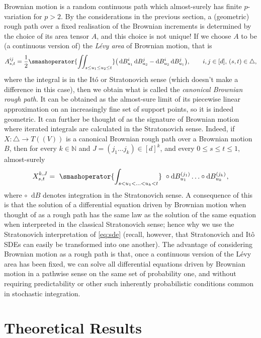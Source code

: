 \documentclass[11pt, letterpaper]{article}
\theoremstyle{definition}
\theoremstyle{remark}
\newcommand{\m}{\hspace{0.25mm}}
\newcommand{\N}{\mathbb{N}}
\newcommand{\diff}{\mathop{}\!\mathrm{d}}
\begin{document}
\begin{appendices}
Brownian motion is a random continuous path which almost-surely has finite $p$-variation for $p > 2$.
By the considerations in the previous section, a (geometric) rough path over a fixed realisation of the Brownian increments is determined by the choice of its area tensor $A$, and this choice is not unique! 
If we choose $A$ to be (a continuous version of) the \emph{L\'evy area} of Brownian motion, that is \[
    A^{ij}_{s,t} = \frac 12 \smashoperator{\iint_{s \le u_1 \le u_2 \le t}} \big( \diff B^i_{u_1} \diff B^j_{u_2} - \diff B^i_{u_2} \diff B^j_{u_1}\big),\qquad i,j\in [d], \, (s,t)\in\triangle,
\] where the integral is in the It\'o or Stratonovich sense (which doesn't make a difference in this case), then we obtain what is called the \emph{canonical Brownian rough path}. It can be obtained as the almost-sure limit of its piecewise linear approximation on an increasingly fine set of support points, so it is indeed geometric. It can further be thought of as the signature of Brownian motion where iterated integrals are calculated in the Stratonovich sense. Indeed, if $X\colon \triangle \to T((V))$ is a canonical Brownian rough path over a Brownian motion $B$, then for every $k\in \N$ and $J =(j_1\ldots j_k) \in [d]^k$, and every $0 \le s \le t \le 1$, almost-surely 
\begin{equation}\label{eq:sigstratonovich}
X^{k,J}_{s,t} = \,\,\smashoperator{\int_{s < u_1 < \ldots < u_k < t}}\,\, \circ \diff B^{(j_1)}_{u_1} \ldots\circ \diff B^{(j_k)}_{u_k}\m,
\end{equation}
where $ \circ \diff B$ denotes integration in the Stratonovich sense. A consequence of this is that the solution of a differential equation driven by Brownian motion when thought of as a rough path has the same law as the solution of the same equation when interpreted in the classical Stratonovich sense; hence why we use the Stratonovich interpretation of \eqref{eq:sde} (recall, however, that Stratonovich and It\^o SDEs can easily be transformed into one another).
The advantage of considering Brownian motion as a rough path is that, once a continuous version of the L\'evy area has been fixed, we can solve all differential equations driven by Brownian motion in a pathwise sense on the same set of probability one, and without requiring predictability or other such inherently probabilistic conditions common in stochastic integration.


\clearpage
\section{Theoretical Results}\label{app:theoretical results}


\end{appendices}
\end{document}
